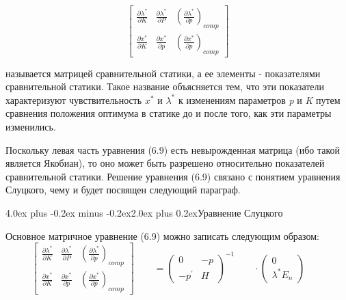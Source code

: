 \documentclass[12pt, 4paper]{book}
\makeatletter
\renewcommand{\section}{\@startsection{section}{1}{1pt}%
	{4.0ex plus -0.2ex minus -0.2ex}{2.0ex plus 0.2ex}{\centering\bf}}%
\makeatother
\begin{document}
{\begin{center}
\[
\begin{bmatrix} 
 \frac{\partial \lambda^{*}}{\partial K} & \frac{\partial \lambda^{*}}{\partial P} & (\frac{\partial \lambda^{*}}{\partial p})_{comp} \\ \frac{\partial x^{*}}{\partial K} & \frac{\partial x^{*}}{\partial p} & (\frac{\partial  x^{*}}{\partial p})_{comp} 
\end{bmatrix}
\]
\end{center}
называется матрицей сравнительной статики, а ее элементы - показателями сравнительной статики. Такое название объясняется тем, что эти показатели характеризуют чувствительность $x^{*}$ и $\lambda^{*}$ к изменениям параметров \textit{p} и \textit{K} путем сравнения положения оптимума в статике до и после того, как эти параметры изменились. 
\par

Поскольку левая часть уравнения (6.9) есть невырожденная матрица (ибо такой является Якобиан), то оно может быть разрешено относительно показателей сравнительной статики. Решение уравнения (6.9) связано с понятием уравнения Слуцкого, чему и будет посвящен следующий параграф.
\newpage
\begin{center}
\section {Уравнение Слуцкого}
\end{center}
\par

Основное матричное уравнение (6.9) можно записать следующим образом: 
\[
\begin{bmatrix} \frac{\partial \lambda^{*}}{\partial K} & \frac{\partial \lambda^{*}}{\partial P} & (\frac{\partial \lambda^{*}}{\partial p})_{comp} \\ \frac{\partial x^{*}}{\partial K} & \frac{\partial x^{*}}{\partial p} & (\frac{\partial x^{*}}{\partial p})_{comp} \end{bmatrix} \qquad =
{\begin{pmatrix} 0 & -p \\ -p^{'} & H \end{pmatrix}}^{-1} \qquad \cdot 
\begin{pmatrix} 0  \\ \lambda^{*}E_n \end{pmatrix} \qquad 
\]
\par

}
\end{document}
